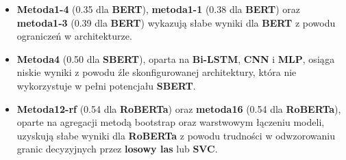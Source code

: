 \begin{itemize}
\begin{itemize}
		      \item \textbf{Metoda1-4} (0.35 dla \textbf{BERT}), \textbf{metoda1-1} (0.38 dla \textbf{BERT}) oraz \textbf{metoda1-3} (0.39 dla \textbf{BERT}) wykazują słabe wyniki dla \textbf{BERT} z powodu ograniczeń w architekturze.
		      \item \textbf{Metoda4} (0.50 dla \textbf{SBERT}), oparta na \textbf{Bi-LSTM}, \textbf{CNN} i \textbf{MLP}, osiąga niskie wyniki z powodu źle skonfigurowanej architektury, która nie wykorzystuje w pełni potencjału \textbf{SBERT}.
		      \item \textbf{Metoda12-rf} (0.54 dla \textbf{RoBERTa}) oraz \textbf{metoda16} (0.54 dla \textbf{RoBERTa}), oparte na agregacji metodą bootstrap oraz warstwowym łączeniu modeli, uzyskują słabe wyniki dla \textbf{RoBERTa} z powodu trudności w odwzorowaniu granic decyzyjnych przez \textbf{losowy las} lub \textbf{SVC}.
	      \end{itemize}
\end{itemize}

